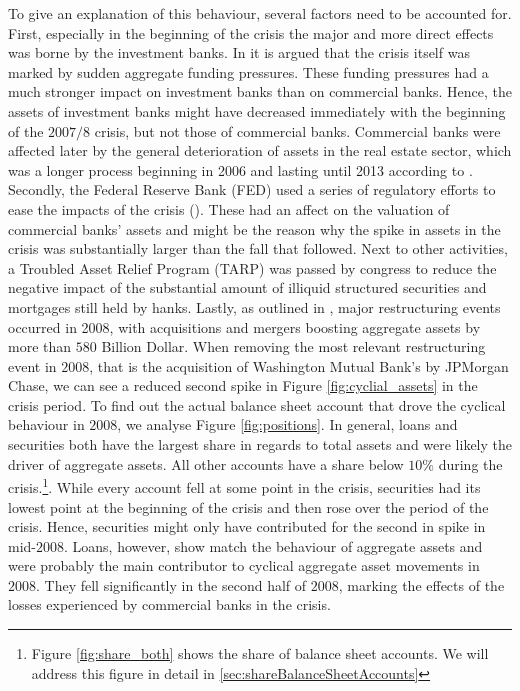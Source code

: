 \documentclass[12pt, a4paper]{article} %
\begin{document}

To give an explanation of this behaviour, several factors need to be accounted for. First, especially in the beginning of the crisis the major and more direct effects was borne by the investment banks. In \citet{antoniades2019commercial} it is argued that the crisis itself was marked by sudden aggregate funding pressures. These funding pressures had a much stronger impact on investment banks than on commercial banks. Hence, the assets of investment banks might have decreased immediately with the beginning of the $2007/8$ crisis, but not those of commercial banks. Commercial banks were affected later by the general deterioration of assets in the real estate sector, which was a longer process beginning in 2006 and lasting until 2013 according to \citet{antoniades2019commercial}.
Secondly, the Federal Reserve Bank (FED) used a series of regulatory efforts to ease the impacts of the crisis (\citet{FEDReport}). These had an affect on the valuation of commercial banks' assets and might be the reason why the spike in assets in the crisis was substantially larger than the fall that followed. Next to other activities, a Troubled Asset Relief Program (TARP) was passed by congress to reduce the negative impact of the substantial amount of  illiquid  structured  securities  and  mortgages  still held  by  hanks.
Lastly, as outlined in \citet{bech2009profits}, major restructuring events occurred in 2008, with acquisitions and mergers boosting aggregate assets by more than $580$ Billion Dollar. When removing the most relevant restructuring event in $2008$, that is the acquisition of  Washington Mutual  Bank's  by JPMorgan Chase, we can see a reduced second spike in Figure \ref{fig:cyclial_assets} in the crisis period. 
To find out the actual balance sheet account that drove the cyclical behaviour in $2008$, we analyse Figure \ref{fig:positions}. In general, loans and securities both have the largest share in regards to total assets and were likely the driver of aggregate assets. All other accounts have a share below $10\%$ during the crisis.\footnote{Figure \ref{fig:share_both} shows the share of balance sheet accounts. We will address this figure in detail in \ref{sec:shareBalanceSheetAccounts}}. While every account fell at some point in the crisis, securities had its lowest point at the beginning of the crisis and then rose over the period of the crisis. Hence, securities might only have contributed for the second in spike in mid-$2008$. Loans, however, show match the behaviour of aggregate assets and were probably the main contributor to cyclical aggregate asset movements in $2008$. They fell significantly in the second half of $2008$, marking the effects of the losses experienced by commercial banks in the crisis.  
\end{document}

